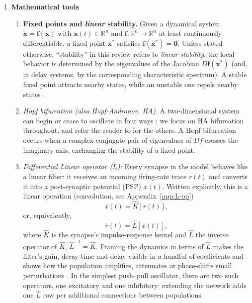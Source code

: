 \documentclass[12pt]{article}
\numberwithin{equation}{section}
\newcommand{\rev}[1]{\begingroup\color{blue}#1\endgroup}
\begin{document}
\begin{enumerate}
\begin{enumerate}
 
\end{enumerate}


\item \textbf{Mathematical tools}
\begin{enumerate}
\item 
\rev{\textbf{Fixed points and \emph{linear} stability.}
Given a dynamical system $\dot{\mathbf{x}}=\mathbf{f}(\mathbf{x})$ with
$\mathbf{x}(t)\in\mathbb{R}^n$ and $\mathbf{f}:\mathbb{R}^n\to\mathbb{R}^n$ at least
continuously differentiable, a fixed point $\mathbf{x}^\ast$ satisfies
$\mathbf{f}(\mathbf{x}^\ast)=\mathbf{0}$.
Unless stated otherwise, ``stability'' in this review refers to \emph{linear stability}:
the local behavior is determined by the eigenvalues of the Jacobian
$D\mathbf{f}(\mathbf{x}^\ast)$ (and, in delay systems, by the corresponding characteristic
spectrum).}
A stable fixed point attracts nearby states, while an unstable one repels nearby states \cite{strogatz2018nonlinear}.
\item \textit{Hopf bifurcation (also \textit{Hopf-Andronov}, HA)}. \rev{A two-dimensional system can begin or cease to oscillate in four ways ; we focus on HA bifurcation throughout, and refer the reader to \cite{strogatz2018nonlinear,hoppensteadt2012weakly,kuznetsov2023elements} for the others.
A Hopf bifurcation occurs when a complex-conjugate pair of eigenvalues of $Df$ crosses the imaginary axis, exchanging the stability of a fixed point.}

\item \emph{Differential Linear operator (\(\hat L\)):} Every synapse in the model behaves like a linear filter: it receives an incoming firing-rate trace \(r(t)\) and converts it into a post-synaptic potential (PSP) \(x(t)\).  Written explicitly, this is a linear operation (convolution, see Appendix~\ref{app:L-op})
\begin{equation}
x(t)=\hat K[r(t)] ,
\end{equation}
or, equivalently,
\begin{equation}
r(t)=\hat L[x(t)] ,
\end{equation}
where \(\hat K\) is the synapse’s impulse-response kernel and \(\hat L\) the inverse operator of \(\hat K\), $\hat L^{-1} = \hat K $.  Framing the dynamics in terms of \(\hat L\) makes the filter’s gain, decay time and delay visible in a handful of coefficients and shows how the population amplifies, attenuates or phase-shifts small perturbations \cite{strogatz2018nonlinear}.  In the simplest push–pull oscillator, there are two such operators, one excitatory and one inhibitory; extending the network adds one \(\hat L\) row per additional connections between populations.


\end{enumerate}
\end{enumerate}
\end{document}
